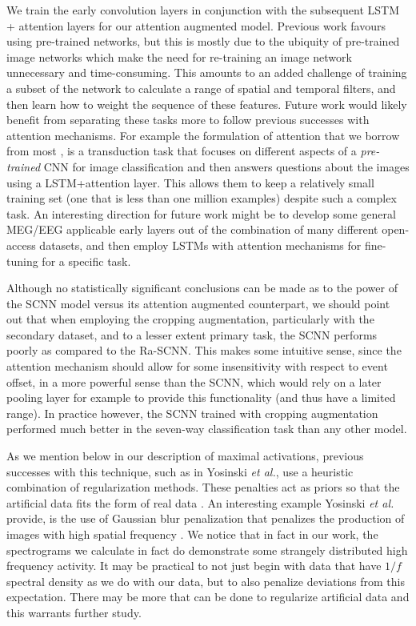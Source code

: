 \documentclass[fleqn,10pt]{wlscirep}
\begin{document}
We train the early convolution layers in conjunction with the subsequent LSTM + attention layers for our attention augmented model. Previous work favours using pre-trained networks, but this is mostly due to the ubiquity of pre-trained image networks which make the need for re-training an image network unnecessary and time-consuming. This amounts to an added challenge of training a subset of the network to calculate a range of spatial and temporal filters, and then learn how to weight the sequence of these features. Future work would likely benefit from separating these tasks more to follow previous successes with attention mechanisms. For example the formulation of attention that we borrow from most \cite{Zhu}, is a transduction task that focuses on different aspects of a {\em pre-trained} CNN for image classification and then answers questions about the images using a LSTM+attention layer. This allows them to keep a relatively small training set (one that is less than one million examples) despite such a complex task. An interesting direction for future work might be to develop some general MEG/EEG applicable early layers out of the combination of many different open-access datasets, and then employ LSTMs with attention mechanisms for fine-tuning for a specific task.

Although no statistically significant conclusions can be made as to the power of the SCNN model versus its attention augmented counterpart, we should point out that when employing the cropping augmentation, particularly with the secondary dataset, and to a lesser extent primary task, the SCNN performs poorly as compared to the Ra-SCNN. This makes some intuitive sense, since the attention mechanism should allow for some insensitivity with respect to event offset, in a more powerful sense than the SCNN, which would rely on a later pooling layer for example to provide this functionality (and thus have a limited range). In practice however, the SCNN trained with cropping augmentation performed much better in the seven-way classification task than any other model.

As we mention below in our description of maximal activations, previous successes with this technique, such as in Yosinski {\em et al.}, use a heuristic combination of regularization methods. These penalties act as priors so that the artificial data fits the form of real data \cite{Yosinski2015}. An interesting example Yosinski {\em et al.} provide, is the use of Gaussian blur penalization that penalizes the production of images with high spatial frequency \cite{Yosinski2015}. We notice that in fact in our work, the spectrograms we calculate in fact do demonstrate some strangely distributed high frequency activity. It may be practical to not just begin with data that have $1/f$ spectral density as we do with our data, but to also penalize deviations from this expectation. There may be more that can be done to regularize artificial data and this warrants further study.
\end{document}
